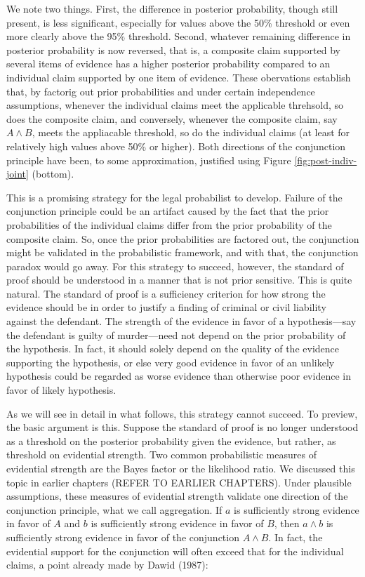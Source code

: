 \documentclass[10pt,dvipsnames,enabledeprecatedfontcommands]{scrartcl}
\begin{document}
We note two things. First, the difference in posterior probability,
though still present, is less significant, especially for values above
the 50\% threshold or even more clearly above the 95\% threshold.
Second, whatever remaining difference in posterior probability is now
reversed, that is, a composite claim supported by several items of
evidence has a higher posterior probability compared to an individual
claim supported by one item of evidence. These obervations establish
that, by factorig out prior probabilities and under certain independence
assumptions, whenever the individual claims meet the applicable
threhsold, so does the composite claim, and conversely, whenever the
composite claim, say \(A \wedge B\), meets the appliacable threshold, so
do the individual claims (at least for relatively high values above 50\%
or higher). Both directions of the conjunction principle have been, to
some approximation, justified using Figure \ref{fig:post-indiv-joint}
(bottom).

This is a promising strategy for the legal probabilist to develop.
Failure of the conjunction principle could be an artifact caused by the
fact that the prior probabilities of the individual claims differ from
the prior probability of the composite claim. So, once the prior
probabilities are factored out, the conjunction might be validated in
the probabilistic framework, and with that, the conjunction paradox
would go away. For this strategy to succeed, however, the standard of
proof should be understood in a manner that is not prior sensitive. This
is quite natural. The standard of proof is a sufficiency criterion for
how strong the evidence should be in order to justify a finding of
criminal or civil liability against the defendant. The strength of the
evidence in favor of a hypothesis---say the defendant is guilty of
murder---need not depend on the prior probability of the hypothesis. In
fact, it should solely depend on the quality of the evidence supporting
the hypothesis, or else very good evidence in favor of an unlikely
hypothesis could be regarded as worse evidence than otherwise poor
evidence in favor of likely hypothesis.

As we will see in detail in what follows, this strategy cannot succeed.
To preview, the basic argument is this. Suppose the standard of proof is
no longer understood as a threshold on the posterior probability given
the evidence, but rather, as threshold on evidential strength. Two
common probabilistic measures of evidential strength are the Bayes
factor or the likelihood ratio. We discussed this topic in earlier
chapters (REFER TO EARLIER CHAPTERS). Under plausible assumptions, these
measures of evidential strength validate one direction of the
conjunction principle, what we call aggregation. If \(a\) is
sufficiently strong evidence in favor of \(A\) and \(b\) is sufficiently
strong evidence in favor of \(B\), then \(a\wedge b\) is sufficiently
strong evidence in favor of the conjunction \(A \wedge B\). In fact, the
evidential support for the conjunction will often exceed that for the
individual claims, a point already made by Dawid (1987):
\end{document}
